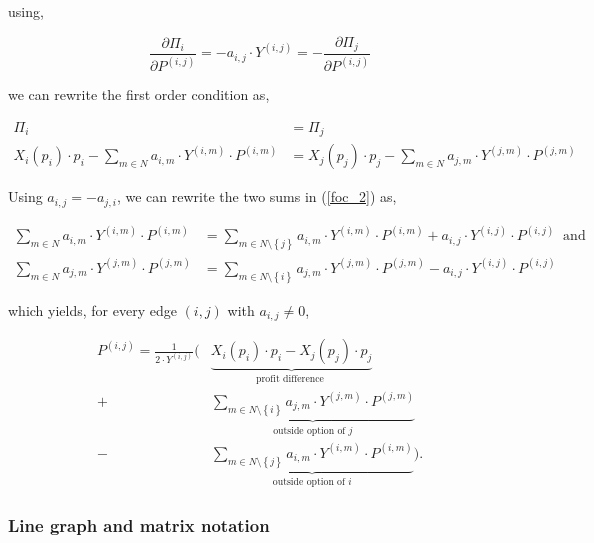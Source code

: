\documentclass[american]{scrartcl}
\newcommand{\set}[1]{\left\{#1\right\}}
\begin{document}
using,

\begin{equation}
	\frac{\partial\Pi_i}{\partial P^{(i, j)}} = - a_{i, j} \cdot Y^{(i, j)} = -\frac{\partial \Pi_j}{\partial P^{(i, j)}}
\end{equation}

we can rewrite the first order condition as,

\begin{equation} \label{foc_2}
	\begin{split}
		\Pi_i &= \Pi_j \\
		X_i(p_i)\cdot p_i - \sum_{m \in N} a_{i, m} \cdot Y^{(i, m)} \cdot P^{(i, m)} &= X_j(p_j)\cdot p_j - \sum_{m \in N} a_{j, m} \cdot Y^{(j, m)} \cdot P^{(j, m)}
	\end{split}
\end{equation}

Using $a_{i, j} = - a_{j, i}$, we can rewrite the two sums in (\ref{foc_2}) as,

\begin{equation}
	\begin{split}
		\sum_{m \in N} a_{i, m} \cdot Y^{(i, m)} \cdot P^{(i, m)} &= \sum_{m \in N \setminus \set{j}}  a_{i, m} \cdot Y^{(i, m)} \cdot P^{(i, m)} + a_{i, j} \cdot Y^{(i, j)} \cdot P^{(i, j)} \ \text{ and }\\
		\sum_{m \in N} a_{j, m} \cdot Y^{(j, m)} \cdot P^{(j, m)} &=  \sum_{m \in N \setminus \set{i}}  a_{j, m} \cdot Y^{(j, m)} \cdot P^{(j, m)} - a_{i, j} \cdot Y^{(i, j)} \cdot P^{(i, j)}
	\end{split}
\end{equation}

which yields, for every edge $(i, j)$ with $ a_{i, j} \neq 0$,

\begin{equation} \label{solution}
	\begin{split}
		P^{(i, j)} = \frac{1}{2\cdot Y^{(i, j)}} \Biggl( &\underbrace{X_i(p_i)\cdot p_i - X_j(p_j)\cdot p_j}_{\text{profit difference }}
		\\  + &\underbrace{\sum_{m\in N\setminus \set{i}} a_{j, m} \cdot Y^{(j, m)} \cdot P^{(j, m)}}_{\text{outside option of } j}
		\\ - & \underbrace{\sum_{m \in N\setminus \set{j}} a_{i, m} \cdot Y^{(i, m)} \cdot P^{(i, m)}}_{\text{outside option of } i} \Biggr).
	\end{split}
\end{equation}

\subsubsection{Line graph and matrix notation}
\end{document}
